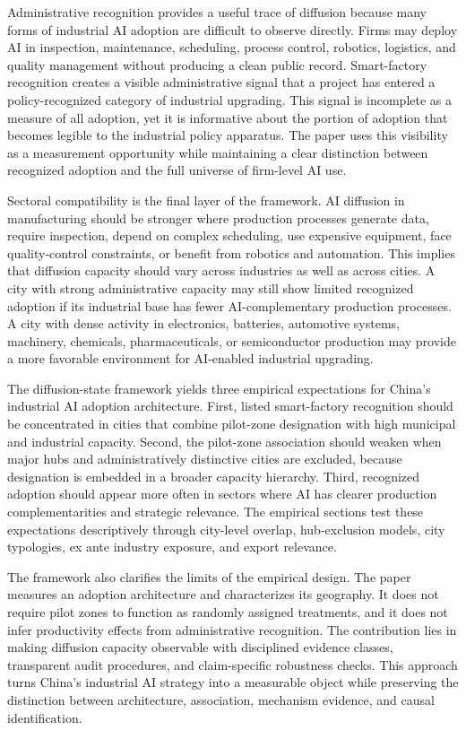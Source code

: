 \documentclass[12pt]{article}
\begin{document}
Administrative recognition provides a useful trace of diffusion because many forms of industrial AI adoption are difficult to observe directly. Firms may deploy AI in inspection, maintenance, scheduling, process control, robotics, logistics, and quality management without producing a clean public record. Smart-factory recognition creates a visible administrative signal that a project has entered a policy-recognized category of industrial upgrading. This signal is incomplete as a measure of all adoption, yet it is informative about the portion of adoption that becomes legible to the industrial policy apparatus. The paper uses this visibility as a measurement opportunity while maintaining a clear distinction between recognized adoption and the full universe of firm-level AI use.

Sectoral compatibility is the final layer of the framework. AI diffusion in manufacturing should be stronger where production processes generate data, require inspection, depend on complex scheduling, use expensive equipment, face quality-control constraints, or benefit from robotics and automation. This implies that diffusion capacity should vary across industries as well as across cities. A city with strong administrative capacity may still show limited recognized adoption if its industrial base has fewer AI-complementary production processes. A city with dense activity in electronics, batteries, automotive systems, machinery, chemicals, pharmaceuticals, or semiconductor production may provide a more favorable environment for AI-enabled industrial upgrading.

The diffusion-state framework yields three empirical expectations for China's industrial AI adoption architecture. First, listed smart-factory recognition should be concentrated in cities that combine pilot-zone designation with high municipal and industrial capacity. Second, the pilot-zone association should weaken when major hubs and administratively distinctive cities are excluded, because designation is embedded in a broader capacity hierarchy. Third, recognized adoption should appear more often in sectors where AI has clearer production complementarities and strategic relevance. The empirical sections test these expectations descriptively through city-level overlap, hub-exclusion models, city typologies, ex ante industry exposure, and export relevance.

The framework also clarifies the limits of the empirical design. The paper measures an adoption architecture and characterizes its geography. It does not require pilot zones to function as randomly assigned treatments, and it does not infer productivity effects from administrative recognition. The contribution lies in making diffusion capacity observable with disciplined evidence classes, transparent audit procedures, and claim-specific robustness checks. This approach turns China's industrial AI strategy into a measurable object while preserving the distinction between architecture, association, mechanism evidence, and causal identification.
\end{document}
